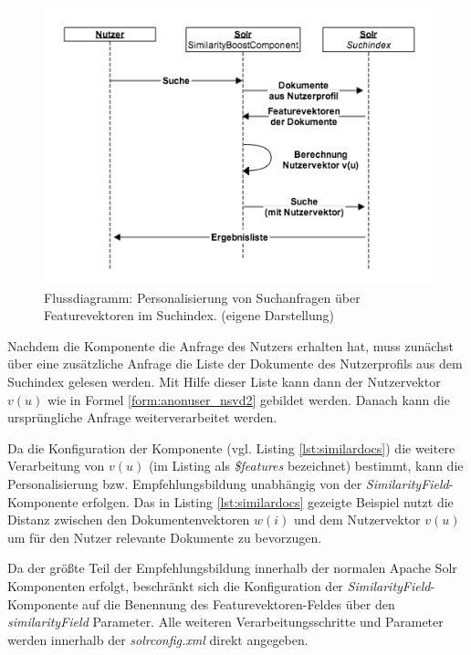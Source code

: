\begin{figure}[H]
  \centering
  \begin{minipage}[b]{5in}
    \includegraphics[width=\textwidth]{Abbildungen/search-rec2.png}
    \caption[Flussdiagram - interne Empfehlungsbildung]{\footnotesize Flussdiagramm: Personalisierung von Suchanfragen über Featurevektoren im Suchindex. {\scriptsize (eigene Darstellung)}}
    \label{fig:seq-intern-recommender}
\end{minipage}
\end{figure}

Nachdem die Komponente die Anfrage des Nutzers erhalten hat, muss zunächst über eine zusätzliche Anfrage die Liste der Dokumente des Nutzerprofils aus dem Suchindex gelesen werden. Mit Hilfe dieser Liste kann dann der Nutzervektor $v(u)$ wie in Formel \ref{form:anonuser_nsvd2} gebildet werden. Danach kann die ursprüngliche Anfrage weiterverarbeitet werden.

Da die Konfiguration der Komponente (vgl. Listing \ref{lst:similardocs}) die weitere Verarbeitung von $v(u)$ (im Listing als \textit{\$features} bezeichnet) bestimmt, kann die Personalisierung bzw. Empfehlungsbildung unabhängig von der \textit{SimilarityField}-Komponente erfolgen. Das in Listing \ref{lst:similardocs} gezeigte Beispiel nutzt die Distanz zwischen den Dokumentenvektoren $w(i)$ und dem Nutzervektor $v(u)$ um für den Nutzer relevante Dokumente zu bevorzugen.

Da der größte Teil der Empfehlungsbildung innerhalb der normalen Apache Solr Komponenten erfolgt, beschränkt sich die Konfiguration der \textit{SimilarityField}-Komponente auf die Benennung des Featurevektoren-Feldes über den \textit{similarityField} Parameter. Alle weiteren Verarbeitungsschritte und Parameter werden innerhalb der \textit{solrconfig.xml} direkt angegeben.

